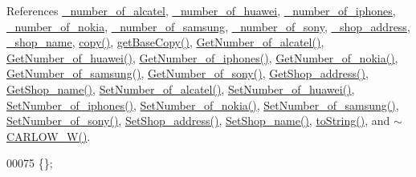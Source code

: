 References \hyperlink{_c_a_r_l_o_w___w_8h_source_l00116}{\+\_\+number\+\_\+of\+\_\+alcatel}, \hyperlink{_c_a_r_l_o_w___w_8h_source_l00114}{\+\_\+number\+\_\+of\+\_\+huawei}, \hyperlink{_c_a_r_l_o_w___w_8h_source_l00111}{\+\_\+number\+\_\+of\+\_\+iphones}, \hyperlink{_c_a_r_l_o_w___w_8h_source_l00115}{\+\_\+number\+\_\+of\+\_\+nokia}, \hyperlink{_c_a_r_l_o_w___w_8h_source_l00112}{\+\_\+number\+\_\+of\+\_\+samsung}, \hyperlink{_c_a_r_l_o_w___w_8h_source_l00113}{\+\_\+number\+\_\+of\+\_\+sony}, \hyperlink{_c_a_r_l_o_w___w_8h_source_l00109}{\+\_\+shop\+\_\+address}, \hyperlink{_c_a_r_l_o_w___w_8h_source_l00110}{\+\_\+shop\+\_\+name}, \hyperlink{_c_a_r_l_o_w___w_8cpp_source_l00037}{copy()}, \hyperlink{_c_a_r_l_o_w___w_8cpp_source_l00024}{get\+Base\+Copy()}, \hyperlink{_c_a_r_l_o_w___w_8cpp_source_l00075}{Get\+Number\+\_\+of\+\_\+alcatel()}, \hyperlink{_c_a_r_l_o_w___w_8cpp_source_l00091}{Get\+Number\+\_\+of\+\_\+huawei()}, \hyperlink{_c_a_r_l_o_w___w_8cpp_source_l00115}{Get\+Number\+\_\+of\+\_\+iphones()}, \hyperlink{_c_a_r_l_o_w___w_8cpp_source_l00083}{Get\+Number\+\_\+of\+\_\+nokia()}, \hyperlink{_c_a_r_l_o_w___w_8cpp_source_l00107}{Get\+Number\+\_\+of\+\_\+samsung()}, \hyperlink{_c_a_r_l_o_w___w_8cpp_source_l00099}{Get\+Number\+\_\+of\+\_\+sony()}, \hyperlink{_c_a_r_l_o_w___w_8cpp_source_l00131}{Get\+Shop\+\_\+address()}, \hyperlink{_c_a_r_l_o_w___w_8cpp_source_l00123}{Get\+Shop\+\_\+name()}, \hyperlink{_c_a_r_l_o_w___w_8cpp_source_l00071}{Set\+Number\+\_\+of\+\_\+alcatel()}, \hyperlink{_c_a_r_l_o_w___w_8cpp_source_l00087}{Set\+Number\+\_\+of\+\_\+huawei()}, \hyperlink{_c_a_r_l_o_w___w_8cpp_source_l00111}{Set\+Number\+\_\+of\+\_\+iphones()}, \hyperlink{_c_a_r_l_o_w___w_8cpp_source_l00079}{Set\+Number\+\_\+of\+\_\+nokia()}, \hyperlink{_c_a_r_l_o_w___w_8cpp_source_l00103}{Set\+Number\+\_\+of\+\_\+samsung()}, \hyperlink{_c_a_r_l_o_w___w_8cpp_source_l00095}{Set\+Number\+\_\+of\+\_\+sony()}, \hyperlink{_c_a_r_l_o_w___w_8cpp_source_l00127}{Set\+Shop\+\_\+address()}, \hyperlink{_c_a_r_l_o_w___w_8cpp_source_l00119}{Set\+Shop\+\_\+name()}, \hyperlink{_c_a_r_l_o_w___w_8cpp_source_l00064}{to\+String()}, and \hyperlink{_c_a_r_l_o_w___w_8cpp_source_l00014}{$\sim$\+C\+A\+R\+L\+O\+W\+\_\+\+W()}.


\begin{DoxyCode}
00075 \{\};
\end{DoxyCode}



